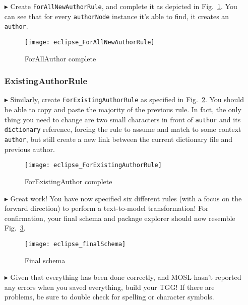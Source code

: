 \begin{itemize}
\item[$\blacktriangleright$] Create \texttt{ForAllNewAuthorRule}, and complete it as depicted in Fig.~\ref{eclipse:ForAllNewAuthorRule}. You can see that for
every \texttt{authorNode} instance it's able to find, it creates an \texttt{author}.

\begin{figure}[htbp]
\begin{center}
  \texttt{[image: eclipse\_ForAllNewAuthorRule]}
  \caption{ForAllAuthor complete}
  \label{eclipse:ForAllNewAuthorRule}
\end{center}
\end{figure}

\subsubsection{ExistingAuthorRule} %

\item[$\blacktriangleright$] Similarly, create \texttt{ForExistingAuthorRule} as specified in Fig.~\ref{eclipse:ForExistingAuthorRule}. You should be able to
copy and paste the majority of the previous rule. In fact, the only thing you need to change are two small characters in front of \texttt{author} and its
\texttt{dictionary} reference, forcing the rule to assume and match to some context \texttt{author}, but still create a new link between the current dictionary
file and previous author.

\begin{figure}[htbp]
\begin{center}
  \texttt{[image: eclipse\_ForExistingAuthorRule]}
  \caption{ForExistingAuthor complete}
  \label{eclipse:ForExistingAuthorRule}
\end{center}
\end{figure}

\newpage

\item[$\blacktriangleright$] Great work! You have now specified six different rules (with a focus on the forward direction) to perform a text-to-model
transformation! For confirmation, your final schema and package explorer should now resemble Fig.~\ref{eclipse:schemaFinal}.

\vspace{0.5cm}

\begin{figure}[htbp]
\begin{center}
  \texttt{[image: eclipse\_finalSchema]}
  \caption{Final schema}
  \label{eclipse:schemaFinal}
\end{center}
\end{figure}

\vspace{0.5cm}

\item[$\blacktriangleright$] Given that everything has been done correctly, and MOSL hasn't reported any errors when you saved everything, build your TGG! If
there are problems, be sure to double check for spelling or character symbols. 

\end{itemize}
